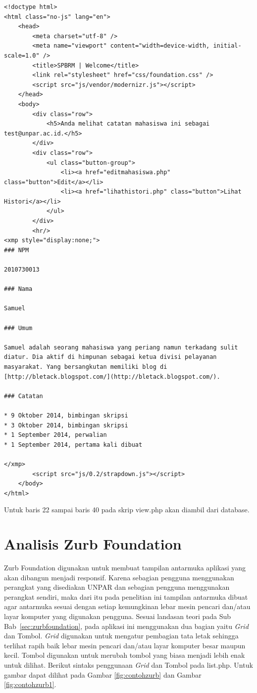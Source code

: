 \begin{lstlisting}[basicstyle=\footnotesize]
<!doctype html>
<html class="no-js" lang="en">
	<head>
		<meta charset="utf-8" />
		<meta name="viewport" content="width=device-width, initial-scale=1.0" />
		<title>SPBRM | Welcome</title>
		<link rel="stylesheet" href="css/foundation.css" />
		<script src="js/vendor/modernizr.js"></script>
	</head>
	<body>
		<div class="row">
			<h5>Anda melihat catatan mahasiswa ini sebagai test@unpar.ac.id.</h5>
		</div>
		<div class="row">
			<ul class="button-group">
				<li><a href="editmahasiswa.php" class="button">Edit</a></li>
				<li><a href="lihathistori.php" class="button">Lihat Histori</a></li>
			</ul>
		</div>
		<hr/>
<xmp style="display:none;">
### NPM

2010730013

### Nama

Samuel
			
### Umum
			
Samuel adalah seorang mahasiswa yang periang namun terkadang sulit diatur. Dia aktif di himpunan sebagai ketua divisi pelayanan masyarakat. Yang bersangkutan memiliki blog di [http://bletack.blogspot.com/](http://bletack.blogspot.com/).
			
### Catatan
			
* 9 Oktober 2014, bimbingan skripsi
* 3 Oktober 2014, bimbingan skripsi
* 1 September 2014, perwalian
* 1 September 2014, pertama kali dibuat

</xmp>
		<script src="js/0.2/strapdown.js"></script>
	</body>
</html>
\end{lstlisting}
Untuk baris 22 sampai baris 40 pada skrip view.php akan diambil dari database.

\section{Analisis Zurb Foundation}
\label{sec:analisisZurbFoundation}
Zurb Foundation digunakan untuk membuat tampilan antarmuka aplikasi yang akan
dibangun menjadi responsif. Karena sebagian pengguna menggunakan perangkat yang disediakan UNPAR dan sebagian pengguna menggunakan perangkat sendiri, maka dari itu pada penelitian ini tampilan antarmuka dibuat agar antarmuka sesuai dengan setiap kemungkinan lebar mesin pencari dan/atau layar komputer yang digunakan pengguna. Sesuai landasan teori pada Sub Bab~\ref{sec:zurbfoundation}, pada aplikasi ini menggunakan dua bagian yaitu {\it Grid} dan Tombol. {\it Grid} digunakan untuk mengatur pembagian tata letak sehingga terlihat rapih baik lebar mesin pencari dan/atau layar komputer besar maupun kecil. Tombol digunakan untuk merubah tombol yang biasa menjadi lebih enak untuk dilihat. Berikut sintaks penggunaan {\it Grid} dan Tombol pada list.php. Untuk gambar dapat dilihat pada Gambar \ref{fig:contohzurb} dan Gambar \ref{fig:contohzurb1}.

